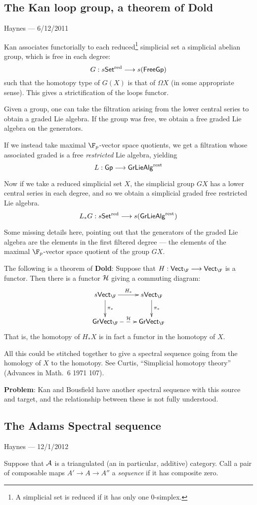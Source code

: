 \documentclass[11pt]{article}
\newcommand{\CONVERSATION}[3]{
\subsection*{#1}
\begin{flushright}
{\small #2 --- #3}
\end{flushright}
}
\begin{document}
\begin{don't show}
\pagebreak
\CONVERSATION{The Kan loop group, a theorem of Dold}{Haynes}{6/12/2011}
Kan associates functorially to each reduced\footnote{A simplicial set is reduced if it has only one 0-simplex.} simplicial set a simplicial abelian group, which is free in each degree:
\[G:s\mathsf{Set^{\textup{red}}}\to s(\mathsf{FreeGp})\]
such that the homotopy type of $G(X)$ is that of $\Omega X$ (in some appropriate sense). This gives a strictification of the loops functor.

Given a group, one can take the filtration arising from the lower central series to obtain a graded Lie algebra. If the group was free, we obtain a free graded Lie algebra on the generators.

If we instead take maximal $\F_p$-vector space quotients, we get a filtration whose associated graded is a free \emph{restricted} Lie algebra, yielding
\[L:\mathsf{Gp}\to\mathsf{GrLieAlg}^{\textup{rest}}\]


Now if we take a reduced simplicial set $X$, the simplicial group $GX$ has a lower central series in each degree, and so we obtain a simplicial graded free restricted Lie algebra.
\[L_*G:s\mathsf{Set^{\textup{red}}}\to s(\mathsf{GrLieAlg}^{\textup{rest}}) \]

Some missing details here, pointing out that the generators of the graded Lie algebra are the elements in the first filtered degree --- the elements of the maximal $\F_p$-vector space quotient of the group $GX$.

The following is a theorem of \textbf{Dold}: Suppose that $H:\mathsf{Vect}_\F\to\mathsf{Vect}_\F$ is a functor. Then there is a functor $\calH$ giving a commuting diagram:
\[\xymatrix{
s\mathsf{Vect}_{\F}\ar[r]^{H_*}\ar[d]^{\pi_*}&
s\mathsf{Vect}_{\F}\ar[d]^{\pi_*}\\
\mathsf{GrVect}_{\F}\ar@{-->}[r]^{\calH}&\mathsf{GrVect}_{\F}
}\]
That is, the homotopy of $H_*X$ is in fact a functor in the homotopy of $X$.

All this could be stitched together to give a spectral sequence going from the homology of $X$ to the homotopy. See Curtis, ``Simplicial homotopy theory'' (Advances in Math.\ 6 1971 107).

\textbf{Problem}: Kan and Bousfield have another spectral sequence with this source and target, and the relationship between these is not fully understood.

\pagebreak
\CONVERSATION{The Adams Spectral sequence}{Haynes}{12/1/2012}
\newcommand{\Pproj}{\calP_{\textup{proj}}}
\newcommand{\Pseq}{\calP_{\textup{seq}}}
Suppose that $\calA$ is a triangulated (an in particular, additive) category. Call a pair of composable maps $A'\to A\to A''$ a \emph{sequence} if it has composite zero.


\end{don't show}
\end{document}
